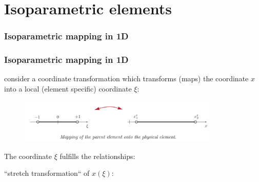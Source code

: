 \documentclass[notes]{beamer}
\begin{document}
\section{Isoparametric elements}
\begin{frame}
\frametitle{Isoparametric mapping in 1D}
\end{frame}

\begin{frame}
\frametitle{Isoparametric mapping in 1D}
consider a coordinate transformation which transforms (maps) the coordinate $x$ into a local (element specific) coordinate $\xi$:	
\begin{figure}[ht]
	\centering
	\includegraphics[width=0.85\textwidth]{figs/1d-isoparametric-shapefn.png}
\end{figure}
The coordinate $\xi$ fulfills the relationships:


``stretch transformation`` of $x(\xi)$: 

\end{frame}
\end{document}
